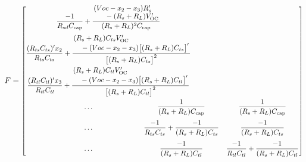 \documentclass[../zhang_thesis.tex]{subfiles}
\begin{document}
\begin{align}
    F & = \scalemath{0.9}{ \left[ \begin{multlined} \begin{array}{@{}c}
        \dfrac{-1}{R_{sd}C_\text{cap}} + \dfrac{\splitfrac{(Voc-x_2-x_3)R_s'}{- (R_s+R_L)V_\text{OC}'}}{(R_s+R_L)^2 C_\text{cap}} \\[3ex]
        \dfrac{(R_{ts}C_{ts})' x_2}{R_{ts}C_{ts}} + \dfrac{\splitfrac{(R_s+R_L)C_{ts}V_\text{OC}'}{- (Voc-x_2-x_3)\big[(R_s+R_L)C_{ts}\big]'}}{\big[(R_s+R_L)C_{ts}\big]^2}  \\[3ex]
        \dfrac{(R_{tl}C_{tl})' x_3}{R_{tl}C_{tl}} + \dfrac{\splitfrac{(R_s+R_L)C_{tl}V_\text{OC}'}{- (Voc-x_2-x_3)\big[(R_s+R_L)C_{tl}\big]'}}{\big[(R_s+R_L)C_{tl}\big]^2} 
        \end{array} \\
        \begin{array}{@{\hspace{1in}\ldots\hspace{1in}}cc@{}}
            \dfrac{1}{(R_s+R_L)C_\text{cap}} & \dfrac{1}{(R_s+R_L)C_\text{cap}} \\[3ex]
            \dfrac{-1}{R_{ts}C_{ts}}+\dfrac{-1}{(R_s+R_L)C_{ts}} & \dfrac{-1}{(R_s+R_L)C_{ts}} \\[3ex]
            \dfrac{-1}{(R_s+R_L)C_{tl}} & \dfrac{-1}{R_{tl}C_{tl}}+\dfrac{-1}{(R_s+R_L)C_{tl}}
        \end{array} \end{multlined} \right] } \\

\end{align}
\end{document}
